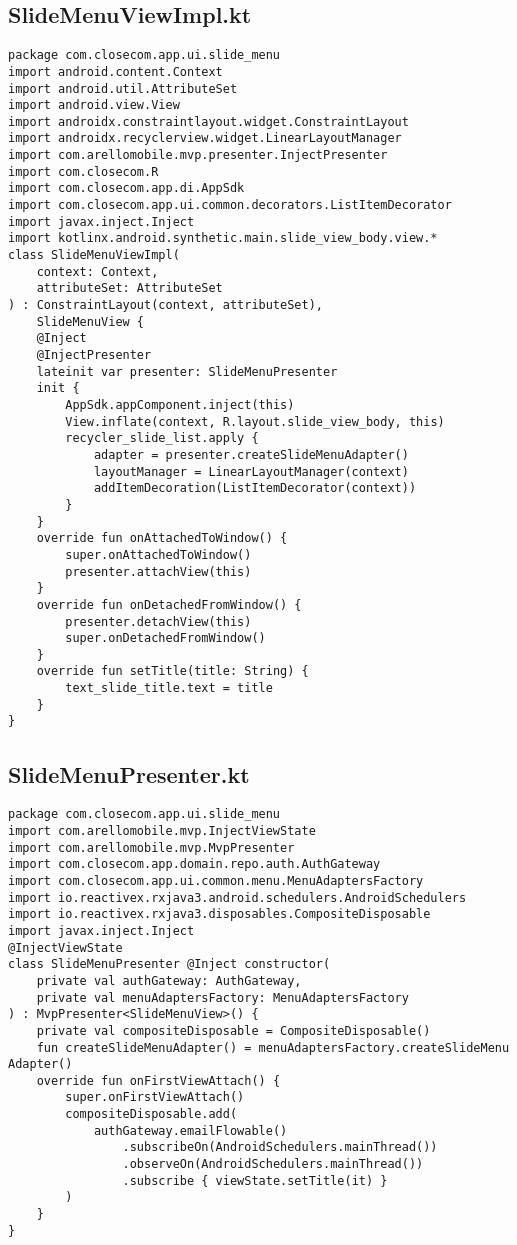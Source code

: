 \documentclass[listing]{espd}
\begin{document}
\subsection{SlideMenuViewImpl.kt}
\begin{verbatim}
package com.closecom.app.ui.slide_menu
import android.content.Context
import android.util.AttributeSet
import android.view.View
import androidx.constraintlayout.widget.ConstraintLayout
import androidx.recyclerview.widget.LinearLayoutManager
import com.arellomobile.mvp.presenter.InjectPresenter
import com.closecom.R
import com.closecom.app.di.AppSdk
import com.closecom.app.ui.common.decorators.ListItemDecorator
import javax.inject.Inject
import kotlinx.android.synthetic.main.slide_view_body.view.*
class SlideMenuViewImpl(
    context: Context,
    attributeSet: AttributeSet
) : ConstraintLayout(context, attributeSet),
    SlideMenuView {
    @Inject
    @InjectPresenter
    lateinit var presenter: SlideMenuPresenter
    init {
        AppSdk.appComponent.inject(this)
        View.inflate(context, R.layout.slide_view_body, this)
        recycler_slide_list.apply {
            adapter = presenter.createSlideMenuAdapter()
            layoutManager = LinearLayoutManager(context)
            addItemDecoration(ListItemDecorator(context))
        }
    }
    override fun onAttachedToWindow() {
        super.onAttachedToWindow()
        presenter.attachView(this)
    }
    override fun onDetachedFromWindow() {
        presenter.detachView(this)
        super.onDetachedFromWindow()
    }
    override fun setTitle(title: String) {
        text_slide_title.text = title
    }
}
\end{verbatim}

\subsection{SlideMenuPresenter.kt}
\begin{verbatim}
package com.closecom.app.ui.slide_menu
import com.arellomobile.mvp.InjectViewState
import com.arellomobile.mvp.MvpPresenter
import com.closecom.app.domain.repo.auth.AuthGateway
import com.closecom.app.ui.common.menu.MenuAdaptersFactory
import io.reactivex.rxjava3.android.schedulers.AndroidSchedulers
import io.reactivex.rxjava3.disposables.CompositeDisposable
import javax.inject.Inject
@InjectViewState
class SlideMenuPresenter @Inject constructor(
    private val authGateway: AuthGateway,
    private val menuAdaptersFactory: MenuAdaptersFactory
) : MvpPresenter<SlideMenuView>() {
    private val compositeDisposable = CompositeDisposable()
    fun createSlideMenuAdapter() = menuAdaptersFactory.createSlideMenu
Adapter()
    override fun onFirstViewAttach() {
        super.onFirstViewAttach()
        compositeDisposable.add(
            authGateway.emailFlowable()
                .subscribeOn(AndroidSchedulers.mainThread())
                .observeOn(AndroidSchedulers.mainThread())
                .subscribe { viewState.setTitle(it) }
        )
    }
}
\end{verbatim}
\end{document}
